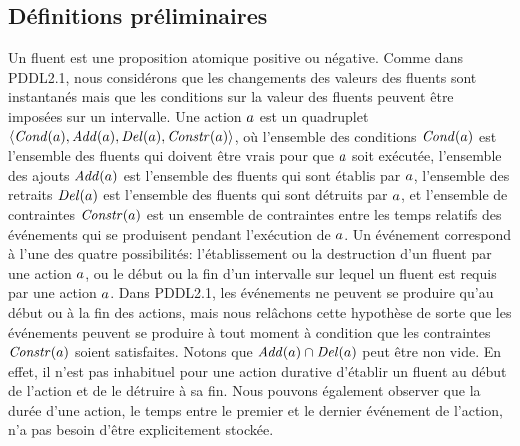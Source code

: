 \subsection{Définitions préliminaires}

Un fluent est une proposition atomique positive ou négative. Comme dans PDDL2.1, nous considérons que les changements des valeurs des fluents sont instantanés mais que les conditions sur la valeur des fluents peuvent être imposées sur un intervalle. Une action $a$ est un quadruplet $\langle\mathit{Cond}(a),\mathit{Add}(a),\mathit{Del}(a),\mathit{Constr}(a)\rangle$, où l'ensemble des conditions $\mathit{Cond}(a)$ est l'ensemble des fluents qui doivent être vrais pour que $a$ soit exécutée, l'ensemble des ajouts $\mathit{Add}(a)$ est l'ensemble des fluents qui sont établis par $a$, l'ensemble des retraits $\mathit{Del}(a)$ est l'ensemble des fluents qui sont détruits par $a$, et l'ensemble de contraintes $\mathit{Constr}(a)$ est un ensemble de contraintes entre les temps relatifs des événements qui se produisent pendant l'exécution de $a$. Un événement correspond à l'une des quatre possibilités: l'établissement ou la destruction d'un fluent par une action $a$, ou le début ou la fin d'un intervalle sur lequel un fluent est requis par une action $a$. Dans PDDL2.1, les événements ne peuvent se produire qu'au début ou à la fin des actions, mais nous rel\^{a}chons cette hypothèse de sorte que les événements peuvent se produire à tout moment à condition que les contraintes $\mathit{Constr}(a)$ soient satisfaites. Notons que $\mathit{Add}(a) \cap \mathit{Del}(a)$ peut être non vide. En effet, il n'est pas inhabituel pour une action durative d'établir un fluent au début de l'action et de le détruire à sa fin. Nous pouvons également observer que la durée d'une action, le temps entre le premier et le dernier événement de l'action, n'a pas besoin d'être explicitement stockée.


